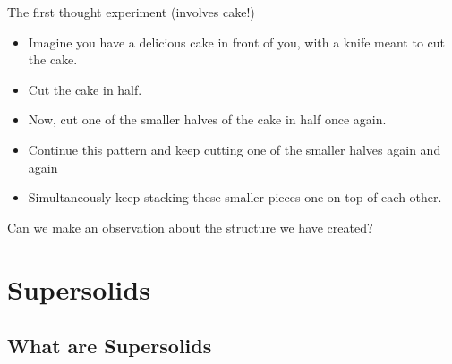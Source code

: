 \documentclass{beamer}
\begin{document}
\begin{frame}{The first thought experiment (involves cake!)}
    \begin{itemize}
        \item Imagine you have a delicious cake in front of you, with a knife meant to cut the cake.
        \item Cut the cake in half.
        \item Now, cut one of the smaller halves of the cake in half once again.
        \item Continue this pattern and keep cutting one of the smaller halves again and again
        \item Simultaneously keep stacking these smaller pieces one on top of each other.
    \end{itemize}
    
    \begin{block}{}
    Can we make an observation about the structure we have created?
    \end{block}

\end{frame}

\section{Supersolids}

\subsection{What are Supersolids}
\end{document}

